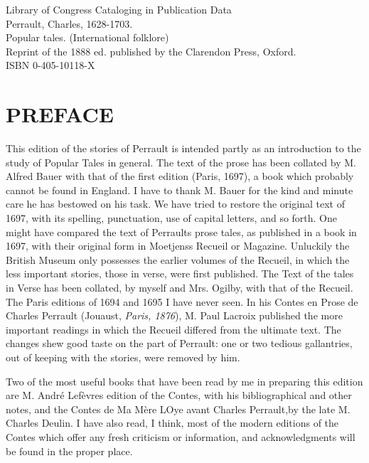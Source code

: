 \documentclass[14pt,a4paper]{memoir}
\begin{document}
\vspace{0.5cm}
\noindent
Library of Congress Cataloging in Publication Data \\
Perrault, Charles, 1628-1703. \\
Popular tales. (International folklore) \\
Reprint of the 1888 ed. published by the Clarendon Press, Oxford. \\
ISBN 0-405-10118-X

\newpage
\tableofcontents*

\newpage
\chapter{PREFACE}

This edition of the stories of Perrault is intended partly
as an introduction to the study of Popular Tales in general. The text of
the prose has been collated by M. Alfred Bauer with that of the
first edition (Paris, 1697), a book which probably cannot be found in
England. I have to thank M. Bauer for the kind and minute care he
has bestowed on his task. We have tried to restore the original text of
1697, with its spelling, punctuation, use of capital letters, and so
forth. One might have compared the text of Perrault\textquotesingle s
prose tales, as published in a book in 1697, with their original
form in Moetjens\textquotesingle s Recueil or Magazine. Unluckily
the British Museum only possesses the earlier volumes of the Recueil, in
which the less important stories, those in verse, were first published.
The Text of the tales in Verse has been collated, by myself and Mrs.
Ogilby, with that of the Recueil. The Paris editions of 1694 and
1695 I have never seen. In his \textquotesingle Contes en Prose de
Charles Perrault\textquotesingle{} (Jouaust, \emph{Paris, 1876}), M.
Paul Lacroix published the more important readings in which the
Recueil differed from the ultimate text. The changes shew good taste on
the part of Perrault: one or two tedious gallantries, out of
keeping with the stories, were removed by him.

Two of the most useful books that have been read by me in
preparing this edition are M. André Lefèvre\textquotesingle s
edition of the Contes, with his bibliographical and other notes,
and the \textquotesingle Contes de Ma Mère L\textquotesingle Oye avant
Charles Perrault,\textquotesingle by the late M. Charles Deulin.
I have also read, I think, most of the modern editions of the
Contes which offer any fresh criticism or information, and
acknowledgments will be found in the proper place.
\end{document}
